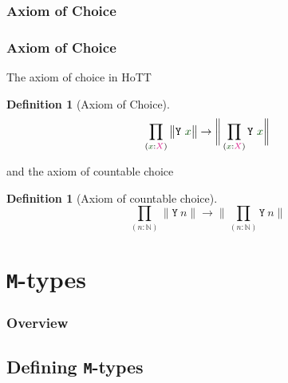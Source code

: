 \documentclass[xelatex,mathserif,serif,notheorems]{beamer} %
\theoremstyle{plain} %
\theoremstyle{definition}
\newtheorem{defn}[thm]{Definition}%
\theoremstyle{remark}
\newcommand*{\term}[1]{\textcolor{green!30!black}{#1}} %
\newcommand*{\type}[1]{\textcolor{magenta!90!black}{#1}}
\newcommand*{\typeformer}[1]{\ensuremath{\mathtt{#1}}}
\newcommand{\setlengths}{
  \setlength{\abovedisplayskip}{4pt}
  \setlength{\belowdisplayskip}{4pt}
  \setlength{\abovedisplayshortskip}{2pt}
  \setlength{\belowdisplayshortskip}{2pt}
}
\begin{document}
\subsubsection{Axiom of Choice}
\begin{frame}
  \frametitle{Axiom of Choice}
  The axiom of choice in HoTT
  \begin{defn}[Axiom of Choice]\setlengths
    \begin{equation}
      \prod_{(\term{x} : \type{X})} \big\| \typeformer{Y}~\term{x} \big\| \rightarrow \bigg\| \prod_{(\term{x} : \type{X})} \typeformer{Y}~\term{x} \bigg\|
    \end{equation}
  \end{defn}
  and the axiom of countable choice
  \begin{defn}[Axiom of countable choice]\setlengths
    \begin{equation}
      \prod_{(n : \mathbb{N})} \big\| \typeformer{Y}~n \big\| \rightarrow \bigg\| \prod_{(n : \mathbb{N})} \typeformer{Y}~n \bigg\|
    \end{equation}
  \end{defn}
\end{frame}

\section{\texttt{M}-types}

\begin{frame}
  \frametitle{Overview}
  \tableofcontents[currentsection,subsubsectionstyle=hide]
\end{frame}

\subsection{Defining \texttt{M}-types}
\end{document}
